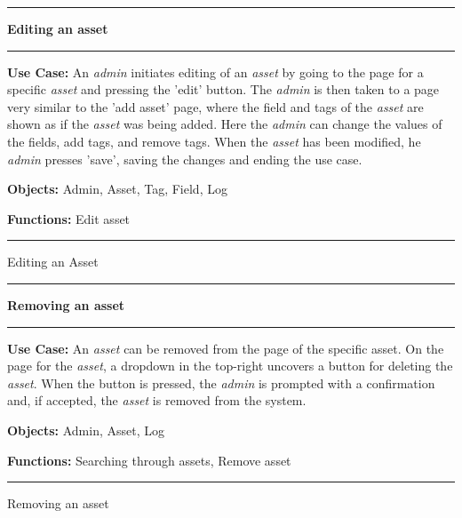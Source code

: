 \begin{use_case}[H]
    \hrule
    \vskip 0.3cm
    \Large
    \begin{center}
    
        \textbf{Editing an asset}
        
    \end{center}
    \vskip 0.1cm
    \hrule
    \vskip 0.2cm
    \normalsize
    
    \textbf{Use Case:} An \textit{admin} initiates editing of an \textit{asset} by going to the page for a specific \textit{asset} and pressing the 'edit' button. The \textit{admin} is then taken to a page very similar to the 'add asset' page, where the field and tags of the \textit{asset} are shown as if the \textit{asset} was being added. Here the \textit{admin} can change the values of the fields, add tags, and remove tags. When the \textit{asset} has been modified, he \textit{admin} presses 'save', saving the changes and ending the use case.
    
    \vskip 0.2cm
    
    \textbf{Objects:} Admin, Asset, Tag, Field, Log
    
    \vskip 0.2cm
    
    \textbf{Functions:} Edit asset
    
    \vskip 0.4cm
    \hrule
    \vskip 0.2cm
    \caption{Editing an Asset} \label{use_case:edit_asset}
\end{use_case}


\begin{use_case}[H]
    \hrule
    \vskip 0.3cm
    \Large
    \begin{center}
    
        \textbf{Removing an asset}
        
    \end{center}
    \vskip 0.1cm
    \hrule
    \vskip 0.2cm
    \normalsize
    
    \textbf{Use Case:} An \textit{asset} can be removed from the page of the specific asset. On the page for the \textit{asset}, a dropdown in the top-right uncovers a button for deleting the \textit{asset}. When the button is pressed, the \textit{admin} is prompted with a confirmation and, if accepted, the \textit{asset} is removed from the system.
    
    \vskip 0.2cm
    
    \textbf{Objects:} Admin, Asset, Log
    
    \vskip 0.2cm
    
    \textbf{Functions:} Searching through assets, Remove asset
    
    \vskip 0.4cm
    \hrule
    \vskip 0.2cm
    \caption{Removing an asset} \label{use_case:removing_an_asset}
\end{use_case}

